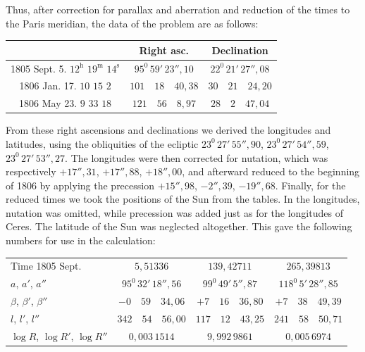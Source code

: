 Thus, after correction for parallax and aberration and reduction of the times
to the Paris meridian, the data of the problem are as follows:
\begin{center}\begingroup\footnotesize\setlength{\tabcolsep}{3pt}\renewcommand{\arraystretch}{1.3}
\begin{tabular}{|c|c|c|}
\hline
 & Right asc. & Declination \\
\hline
1805 Sept. 5. $12^{\mathrm h}$ $19^{\mathrm m}$ $14^{\mathrm s}$ & $95^0\,59'\,23''{,}10$ & $22^0\,21'\,27''{,}08$ \\
1806 Jan. 17. $10$ $15$ $2$ & $101\quad18\quad40{,}38$ & $30\quad21\quad24{,}20$ \\
1806 May 23. $9$ $33$ $18$ & $121\quad56\quad8{,}97$ & $28\quad2\quad47{,}04$ \\
\hline
\end{tabular}
\endgroup\end{center}

From these right ascensions and declinations we derived the longitudes and
latitudes, using the obliquities of the ecliptic $23^0\,27'\,55''{,}90$, $23^0\,27'\,54''{,}59$,
$23^0\,27'\,53''{,}27$. The longitudes were then corrected for nutation, which was respectively
$+17''{,}31$, $+17''{,}88$, $+18''{,}00$, and afterward reduced to the beginning of 1806 by applying the precession $+15''{,}98$, $-2''{,}39$, $-19''{,}68$. Finally, for the reduced times
we took the positions of the Sun from the tables. In the longitudes, nutation was
omitted, while precession was added just as for the longitudes of Ceres. The latitude
of the Sun was neglected altogether. This gave the following numbers for use in the calculation:
\begin{center}\begingroup\footnotesize\setlength{\tabcolsep}{3pt}\renewcommand{\arraystretch}{1.3}
\begin{tabular}{l|c|c|c}
Time 1805 Sept. & $5{,}51336$ & $139{,}42711$ & $265{,}39813$ \\
$a$, $a'$, $a''$ & $95^0\,32'\,18''{,}56$ & $99^0\,49'\,5''{,}87$ & $118^0\,5'\,28''{,}85$ \\
$\beta$, $\beta'$, $\beta''$ & $-0\quad59\quad34{,}06$ & $+7\quad16\quad36{,}80$ & $+7\quad38\quad49{,}39$ \\
$l$, $l'$, $l''$ & $342\quad54\quad56{,}00$ & $117\quad12\quad43{,}25$ & $241\quad58\quad50{,}71$ \\
$\log R$, $\log R'$, $\log R''$ & $0{,}003\,1514$ & $9{,}992\,9861$ & $0{,}005\,6974$ \\
\end{tabular}
\endgroup\end{center}

